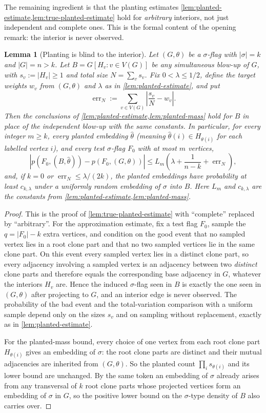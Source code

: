 \documentclass[11pt]{article}
\newtheorem{lemma}[lemma]{Lemma}
\theoremstyle{definition}
\begin{document}
The remaining ingredient is that the planting estimates
\cref{lem:planted-estimate,lem:true-planted-estimate} hold for \emph{arbitrary} interiors,
not just independent and complete ones.  This is the formal content of the opening remark:
the interior is never observed.

\begin{lemma}[Planting is blind to the interior]\label{lem:general-planting-estimate}
Let $(G,\theta)$ be a $\sigma$-flag with $|\sigma|=k$ and $|G|=n>k$.  Let
$B=G[H_v:v\in V(G)]$ be any simultaneous blow-up of $G$, with
$s_v:=|H_v|\ge1$ and total size $N=\sum_v s_v$.  Fix $0<\lambda\le1/2$, define the target
weights $w_v$ from $(G,\theta)$ and $\lambda$ as in \cref{lem:planted-estimate}, and put
\[
  \operatorname{err}_N:=\sum_{v\in V(G)}\left|\frac{s_v}{N}-w_v\right|.
\]
Then the conclusions of \cref{lem:planted-estimate,lem:planted-mass} hold for $B$ in
place of the independent blow-up with the same constants.  In particular, for every
integer $m\ge k$, every planted embedding
$\widehat\theta$ (meaning $\widehat\theta(i)\in H_{\theta(i)}$ for each labelled
vertex $i$), and every test $\sigma$-flag $F_0$ with at most $m$ vertices,
\[
  \left|p(F_0,(B,\widehat\theta))-p(F_0,(G,\theta))\right|
  \le
  L_m\left(\lambda+\frac1{n-k}+\operatorname{err}_N\right),
\]
and, if $k=0$ or $\operatorname{err}_N\le\lambda/(2k)$, the planted embeddings have
probability at least $c_{k,\lambda}$ under a uniformly random embedding of
$\sigma$ into $B$.  Here $L_m$ and $c_{k,\lambda}$ are the constants from
\cref{lem:planted-estimate,lem:planted-mass}.
\end{lemma}

\begin{proof}
This is the proof of \cref{lem:true-planted-estimate} with ``complete'' replaced by
``arbitrary''.  For the approximation estimate, fix a test flag $F_0$, sample the
$q=|F_0|-k$ extra vertices, and condition on the good event that no sampled vertex lies in
a root clone part and that no two sampled vertices lie in the same clone part.  On
this event every sampled vertex lies in a distinct clone part, so every adjacency
involving a sampled vertex is an adjacency between two \emph{distinct} clone parts and
therefore equals the corresponding base adjacency in $G$, whatever the interiors $H_v$
are.  Hence the induced $\sigma$-flag seen in $B$ is exactly the one seen in $(G,\theta)$
after projecting to $G$, and an interior edge is never observed.  The probability of the
bad event and the total-variation comparison with a uniform sample depend only on the
sizes $s_v$ and on sampling without replacement, exactly as in
\cref{lem:planted-estimate}.

For the planted-mass bound, every choice of one vertex from each root clone part
$H_{\theta(i)}$ gives an embedding of $\sigma$: the root clone parts are distinct
and their mutual adjacencies are inherited from $(G,\theta)$.  So the planted count
$\prod_i s_{\theta(i)}$ and its lower bound are unchanged.  By the same token an
embedding of $\sigma$ already arises from any transversal of $k$ root clone parts
whose projected vertices form an embedding of $\sigma$ in $G$, so the positive lower
bound on the $\sigma$-type density of $B$ also carries over.
\end{proof}
\end{document}
